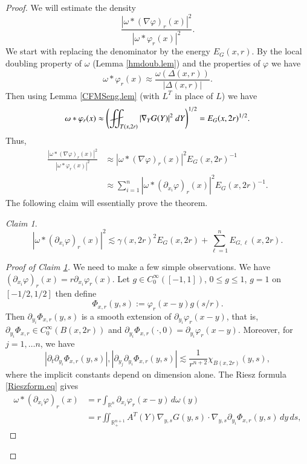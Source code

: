 \documentclass[11pt, a4paper,leqno]{amsart}
\def\Yint#1{\mathchoice
    {\YYint\displaystyle\textstyle{#1}}%
    {\YYint\textstyle\scriptstyle{#1}}%
    {\YYint\scriptstyle\scriptscriptstyle{#1}}%
    {\YYint\scriptscriptstyle\scriptscriptstyle{#1}}%
      \!\iint}
\def\YYint#1#2#3{{\setbox0=\hbox{$#1{#2#3}{\iint}$}
    \vcenter{\hbox{$#2#3$}}\kern-.51\wd0}}
\def\longdash{{-}\mkern-3.5mu{-}}
\def\tiltlongdash{\rotatebox[origin=c]{15}{$\longdash$}}
\def\fiint{\Yint\tiltlongdash}
\theoremstyle{plain}
\theoremstyle{definition}
\theoremstyle{remark}
\newtheorem{claim}[equation]{Claim}
\numberwithin{equation}{section}
\def\Yint#1{\mathchoice
    {\YYint\displaystyle\textstyle{#1}}%
    {\YYint\textstyle\scriptstyle{#1}}%
    {\YYint\scriptstyle\scriptscriptstyle{#1}}%
    {\YYint\scriptscriptstyle\scriptscriptstyle{#1}}%
      \!\iint}
\def\YYint#1#2#3{{\setbox0=\hbox{$#1{#2#3}{\iint}$}
    \vcenter{\hbox{$#2#3$}}\kern-.51\wd0}}
\def\longdash{{-}\mkern-3.5mu{--}}
\def\tiltlongdash{\rotatebox[origin=c]{15}{$\longdash$}}
\def\fiint{\Yint\tiltlongdash}
\begin{document}
\begin{proof}
We will estimate the density
\[\frac{|\omega \ast (\nabla \varphi)_r(x)|^2}{|\omega \ast \varphi_r(x)|^2}.\]
We start with replacing the denominator by the energy $E_G(x,r)$. By the local doubling property of $\omega$ (Lemma \ref{hmdoub.lem}) and the properties of $\varphi$ we have
\[\omega \ast \varphi_r(x) \approx \frac{\omega(\Delta(x,r))}{|\Delta(x,r)|}.\]
Then using Lemma \ref{CFMSeng.lem} (with $L^T$ in place of $L$) we have
\[\omega \ast \varphi_r(x) \approx \left(\fiint_{T(x,2r)} |\nabla_Y G(Y)|^2 \ dY \right)^{1/2} = E_G(x,2r)^{1/2}.\]
Thus,
\begin{equation}\label{engreplaced.eq}
\begin{split}
\frac{|\omega \ast (\nabla \varphi)_r(x)|^2}{|\omega \ast \varphi_r(x)|^2} &\approx |\omega \ast (\nabla \varphi)_r(x)|^2 E_G(x,2r)^{-1} 
\\& \approx \sum_{i =1}^n |\omega \ast (\partial_{x_i} \varphi)_r(x)|^2 E_G(x,2r)^{-1}.
\end{split}
\end{equation}
The following claim will essentially prove the theorem.
\begin{claim}\label{mtmc.cl}
\[|\omega \ast (\partial_{x_i} \varphi)_r(x)|^2 \lesssim  \gamma(x, 2 r)^2 E_G(x,2 r) + \sum_{\ell = 1}^n E_{G,\ell}(x,2 r).\]
\end{claim}
\begin{proof}[Proof of Claim \ref{mtmc.cl}]
We need to make a few simple observations. We have $(\partial_{x_i} \varphi)_r(x) = r \partial_{x_i} \varphi_r(x)$. Let $g \in C_0^\infty([-1,1])$, $0 \le g \le 1$, $g = 1$ on $[-1/2,1/2]$ then define
\[\Phi_{x,r}(y,s) := \varphi_r (x -y) g(s/r).\]
Then $\partial_{y_i} \Phi_{x,r}(y,s)$ is a smooth extension of $\partial_{y_i} \varphi_r(x-y)$, that is, $\partial_{y_i} \Phi_{x,r}  \in C^\infty_0(B(x,2r))$ and $\partial_{y_i} \Phi_{x,r}(\cdot,0) = \partial_{y_i} \varphi_r(x-y)$. Moreover, for $j = 1,\dots n$, we have
\begin{equation}\label{Phibds.eq}
|\partial_t \partial_{y_i} \Phi_{x,r}(y,s)|,  |\partial_{y_j} \partial_{y_i} \Phi_{x,r}(y,s)| \lesssim \frac{1}{r^{n+2}}\chi_{B(x,2r)}(y,s),
\end{equation}
where the implicit constants depend on dimension alone.
The Riesz formula \eqref{Rieszform.eq} gives
\begin{align*}
\omega \ast (\partial_{x_i} \varphi)_r(x) &= r \int_{\mathbb{R}^n} \partial_{x_i} \varphi_r(x - y) \, d\omega(y) 
\\& =  r\iint_{\mathbb{R}^{n+1}_+} A^{T}(Y) \nabla_{y,s} G(y,s) \cdot \nabla_{y,s} \partial_{y_i} \Phi_{x,r}(y,s) \, dy \, ds,

\end{align*}
\end{proof}
\end{proof}
\end{document}
